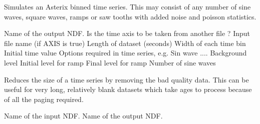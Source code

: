 
\begin{manroutinedescription}

Simulates an Asterix binned time series. This may consist of
any number of sine waves, square waves, ramps or saw tooths with 
added noise and poisson statistics.

\begin{manparametertable}
   Name of the output NDF.
   Is the time axis to be taken from another file ?
   Input file name (if AXIS is true)
   Length of dataset (seconds)
   Width of each time bin
   Initial time value
   Options required in time series, e.g. Sin wave ....
   Background level
   Initial level for ramp
   Final level for ramp
   Number of sine waves
\end{manparametertable}

\end{manroutinedescription}


\begin{manroutinedescription}

Reduces the size of a time series by removing the bad quality data.
This can be useful for very long, relatively blank datasets which 
take ages to process because of all the paging required.

\begin{manparametertable}
   Name of the input NDF.
   Name of the output NDF.

\end{manparametertable}

\end{manroutinedescription}

